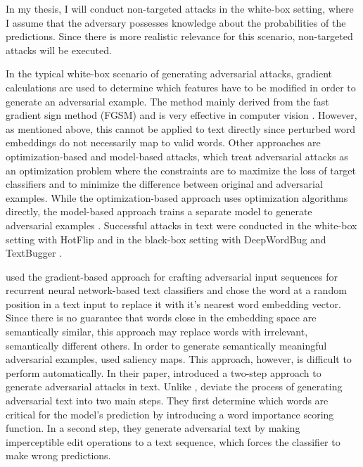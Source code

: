 In my thesis, I will conduct non-targeted attacks in the white-box setting, where I assume that the adversary possesses knowledge about the probabilities of the predictions. Since there is more realistic relevance for this scenario, non-targeted attacks will be executed.

In the typical white-box scenario of generating adversarial attacks, gradient calculations are used to determine which features have to be modified in order to generate an adversarial example. The method mainly derived from the fast gradient sign method (FGSM) and is very effective in computer vision \cite{goodfellow2014explaining}. However, as mentioned above, this cannot be applied to text directly since perturbed word embeddings do not necessarily map to valid words. Other approaches are optimization-based and model-based attacks, which treat adversarial attacks as an optimization problem where the constraints are to maximize the loss of target classifiers and to minimize the difference between original and adversarial examples. While the optimization-based approach uses optimization algorithms directly, the model-based approach trains a separate model to generate adversarial examples \cite{xu2020elephant}. Successful attacks in text were conducted in the white-box setting with HotFlip \cite{ebrahimi2017hotflip} and in the black-box setting with DeepWordBug \cite{gao2018black} and TextBugger \cite{li2018textbugger}. 

\cite{papernot2016crafting} used the gradient-based approach for crafting adversarial input sequences for recurrent neural network-based text classifiers and chose the word at a random position in a text input to replace it with it's nearest word embedding vector. Since there is no guarantee that words close in the embedding space are semantically similar, this approach may replace words with irrelevant, semantically different others. 
In order to generate semantically meaningful adversarial examples, \cite{samanta2017towards} used saliency maps. This approach, however, is difficult to perform automatically. In their paper, \cite{gao2018black} introduced a two-step approach to generate adversarial attacks in text. Unlike \cite{papernot2016crafting}, \cite{gao2018black} deviate the process of generating adversarial text into two main steps. They first determine which words are critical for the model's prediction by introducing a word importance scoring function. In a second step, they generate adversarial text by making imperceptible edit operations to a text sequence, which forces the classifier to make wrong predictions.


